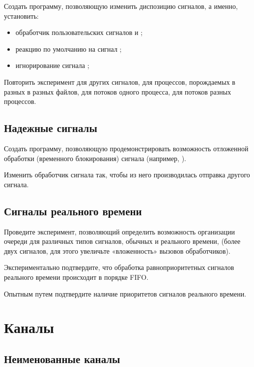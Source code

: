 Создать программу, позволяющую изменить диспозицию сигналов, а именно, установить:

\begin{itemize}
	\item обработчик пользовательских сигналов  и ;
	\item реакцию по умолчанию на сигнал ;
	\item игнорирование сигнала ;
\end{itemize}

Повторить эксперимент для других сигналов, для процессов, порождаемых в разных в разных файлов, для потоков одного процесса, для потоков разных процессов.



\subsection{Надежные сигналы}

Создать программу, позволяющую продемонстрировать возможность отложенной обработки (временного блокирования) сигнала (например, ).

Изменить обработчик сигнала так, чтобы из него производилась отправка другого сигнала.

\subsection{Сигналы реального времени}

Проведите эксперимент, позволяющий определить возможность организации очереди для различных типов сигналов, обычных и реального времени, (более двух сигналов, для этого увеличьте «вложенность» вызовов обработчиков). 

Экспериментально подтвердите, что обработка равноприоритетных сигналов реального времени происходит в порядке FIFO. 

Опытным путем подтвердите наличие приоритетов сигналов реального времени.

\section{Каналы}

\subsection{Неименованные каналы}

